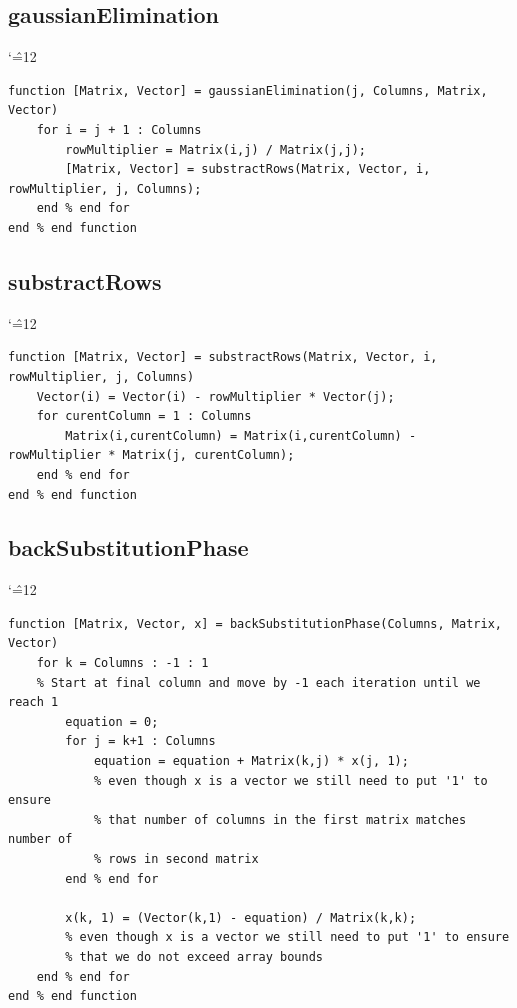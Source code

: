\documentclass[12pt]{report}
\newenvironment{simplechar}{%
   \catcode`\^=12
}{}
\begin{document}
\newpage
\subsection{gaussianElimination}
\begin{simplechar}
\begin{lstlisting}
function [Matrix, Vector] = gaussianElimination(j, Columns, Matrix, Vector)
    for i = j + 1 : Columns
        rowMultiplier = Matrix(i,j) / Matrix(j,j);
        [Matrix, Vector] = substractRows(Matrix, Vector, i, rowMultiplier, j, Columns);
    end % end for
end % end function
\end{lstlisting}
\end{simplechar}

\subsection{substractRows}
\begin{simplechar}
\begin{lstlisting}
function [Matrix, Vector] = substractRows(Matrix, Vector, i, rowMultiplier, j, Columns)
    Vector(i) = Vector(i) - rowMultiplier * Vector(j);
    for curentColumn = 1 : Columns
        Matrix(i,curentColumn) = Matrix(i,curentColumn) - rowMultiplier * Matrix(j, curentColumn);
    end % end for
end % end function
\end{lstlisting}
\end{simplechar}

\newpage
\subsection{backSubstitutionPhase}
\begin{simplechar}
\begin{lstlisting}
function [Matrix, Vector, x] = backSubstitutionPhase(Columns, Matrix, Vector)
    for k = Columns : -1 : 1
    % Start at final column and move by -1 each iteration until we reach 1
        equation = 0;
        for j = k+1 : Columns
            equation = equation + Matrix(k,j) * x(j, 1);
            % even though x is a vector we still need to put '1' to ensure
            % that number of columns in the first matrix matches number of
            % rows in second matrix
        end % end for

        x(k, 1) = (Vector(k,1) - equation) / Matrix(k,k);
        % even though x is a vector we still need to put '1' to ensure
        % that we do not exceed array bounds
    end % end for
end % end function
\end{lstlisting}
\end{simplechar}
\end{document}
